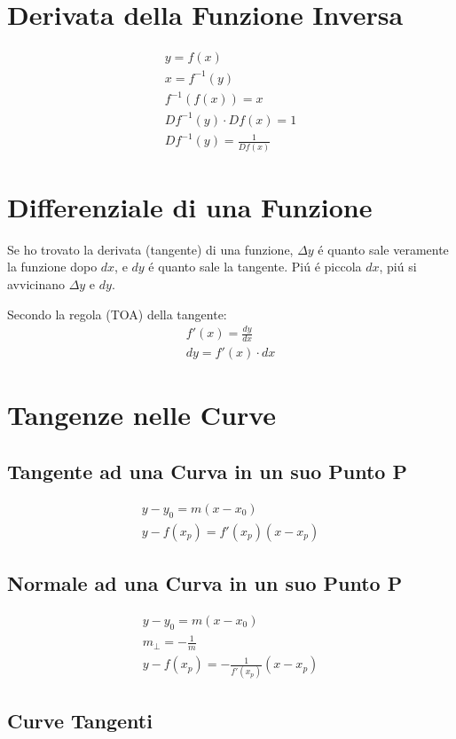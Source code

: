 \documentclass{article}
\begin{document}
\section{Derivata della Funzione Inversa}
\begin{gather*}
    y=f(x)\\
    x=f^{-1}(y)\\
    f^{-1}(f(x)) =x\\
    Df^{-1}(y)\cdot Df(x) = 1\\
    Df^{-1}(y)=\frac{1}{Df(x)}
\end{gather*}
\section{Differenziale di una Funzione}
Se ho trovato la derivata (tangente) di una funzione, $\Delta y$ é quanto sale veramente la funzione dopo $dx$, e $dy$ é quanto sale la tangente. Piú é piccola $dx$, piú si avvicinano $\Delta y$ e $dy$.

Secondo la regola (TOA) della tangente:
\begin{gather*}
    f'(x)=\frac{dy}{dx}\\
    dy=f'(x)\cdot dx
\end{gather*}

\section{Tangenze nelle Curve}
\subsection{Tangente ad una Curva in un suo Punto P}
    \begin{gather*}
        y-y_0=m(x-x_0)\\
        y-f(x_p)=f'(x_p)(x-x_p)
    \end{gather*}
\subsection{Normale ad una Curva in un suo Punto P}
    \begin{gather*}
        y-y_0=m(x-x_0)\\
        m_\perp =-\frac{1}{m}\\
        y-f(x_p)=-\frac{1}{f'(x_p)}(x-x_p)
    \end{gather*}

\subsection{Curve Tangenti}
\end{document}
